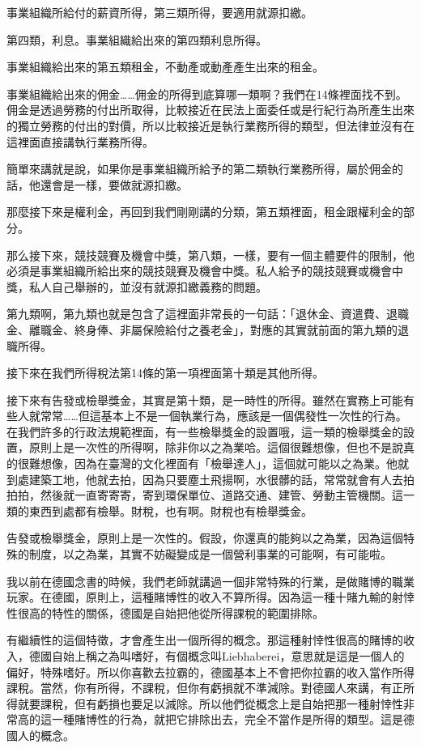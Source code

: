\documentclass[]{ctexbook}
\begin{document}
事業組織所給付的薪資所得，第三類所得，要適用就源扣繳。

第四類，利息。事業組織給出來的第四類利息所得。

事業組織給出來的第五類租金，不動產或動產產生出來的租金。

事業組織給出來的佣金\ldots\ldots 佣金的所得到底算哪一類啊？我們在14條裡面找不到。佣金是透過勞務的付出所取得，比較接近在民法上面委任或是行紀行為所產生出來的獨立勞務的付出的對價，所以比較接近是執行業務所得的類型，但法律並沒有在這裡面直接講執行業務所得。

簡單來講就是說，如果你是事業組織所給予的第二類執行業務所得，屬於佣金的話，他還會是一樣，要做就源扣繳。

那麼接下來是權利金，再回到我們剛剛講的分類，第五類裡面，租金跟權利金的部分。

那么接下來，競技競賽及機會中獎，第八類，一樣，要有一個主體要件的限制，他必須是事業組織所給出來的競技競賽及機會中獎。私人給予的競技競賽或機會中獎，私人自己舉辦的，並沒有就源扣繳義務的問題。

第九類啊，第九類也就是包含了這裡面非常長的一句話：「退休金、資遣費、退職金、離職金、終身俸、非屬保險給付之養老金」，對應的其實就前面的第九類的退職所得。

接下來在我們所得稅法第14條的第一項裡面第十類是其他所得。

接下來有告發或檢舉獎金，其實是第十類，是一時性的所得。雖然在實務上可能有些人就常常\ldots\ldots 但這基本上不是一個執業行為，應該是一個偶發性一次性的行為。在我們許多的行政法規範裡面，有一些檢舉獎金的設置哦，這一類的檢舉獎金的設置，原則上是一次性的所得啊，除非你以之為業哈。這個很難想像，但也不是說真的很難想像，因為在臺灣的文化裡面有「檢舉達人」，這個就可能以之為業。他就到處建築工地，他就去拍，因為只要塵土飛揚啊，水很髒的話，常常就會有人去拍拍拍，然後就一直寄寄寄，寄到環保單位、道路交通、建管、勞動主管機關。這一類的東西到處都有檢舉。財稅，也有啊。財稅也有檢舉獎金。

告發或檢舉獎金，原則上是一次性的。假設，你還真的能夠以之為業，因為這個特殊的制度，以之為業，其實不妨礙變成是一個營利事業的可能啊，有可能啦。

我以前在德國念書的時候，我們老師就講過一個非常特殊的行業，是做賭博的職業玩家。在德國，原則上，這種賭博性的收入不算所得。因為這一種十賭九輸的射悻性很高的特性的關係，德國是自始把他從所得課稅的範圍排除。

有繼續性的這個特徵，才會產生出一個所得的概念。那這種射悻性很高的賭博的收入，德國自始上稱之為叫嗜好，有個概念叫Liebhaberei，意思就是這是一個人的偏好，特殊嗜好。所以你喜歡去拉霸的，德國基本上不會把你拉霸的收入當作所得課稅。當然，你有所得，不課稅，但你有虧損就不準減除。對德國人來講，有正所得就要課稅，但有虧損也要足以減除。所以他們從概念上是自始把那一種射悻性非常高的這一種賭博性的行為，就把它排除出去，完全不當作是所得的類型。這是德國人的概念。
\end{document}

